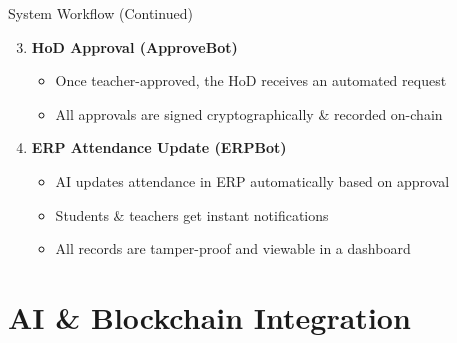 \documentclass{beamer}
\begin{document}
\begin{frame}{System Workflow (Continued)}
\begin{enumerate}\setcounter{enumi}{2}
    \item \textbf{HoD Approval (ApproveBot)}
    \begin{itemize}
        \item Once teacher-approved, the HoD receives an automated request
        \item All approvals are signed cryptographically \& recorded on-chain
    \end{itemize}
    
    \item \textbf{ERP Attendance Update (ERPBot)}
    \begin{itemize}
        \item AI updates attendance in ERP automatically based on approval
        \item Students \& teachers get instant notifications
        \item All records are tamper-proof and viewable in a dashboard
    \end{itemize}
\end{enumerate}
\end{frame}

\section{AI \& Blockchain Integration}
\end{document}
